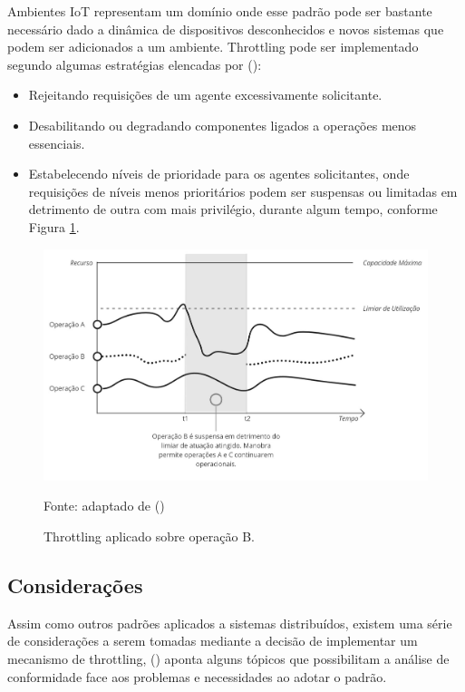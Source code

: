 Ambientes IoT representam um domínio onde esse padrão pode ser bastante necessário dado a dinâmica de dispositivos desconhecidos e novos sistemas que podem ser adicionados a um ambiente. Throttling pode ser implementado segundo algumas estratégias elencadas por \citeauthor{martinekuan_throttling_nodate} (\citeyear{martinekuan_throttling_nodate}):

\begin{itemize}
	\item Rejeitando requisições de um agente excessivamente solicitante.
	\item Desabilitando ou degradando componentes ligados a operações menos essenciais. 
	\item Estabelecendo níveis de prioridade para os agentes solicitantes, onde requisições de níveis menos prioritários podem ser suspensas ou limitadas em detrimento de outra com mais privilégio, durante algum tempo, conforme Figura \ref{fig:cap2throttlingexample}.
\end{itemize}

\begin{figure}[H]
	\centering
	\caption{Throttling aplicado sobre operação B.}
	\label{fig:cap2throttlingexample}
	\includegraphics[width=0.8\linewidth]{Imagens/cap2/cap2throttlingexample}	
	
	Fonte: adaptado de \citeauthor{martinekuan_throttling_nodate} (\citeyear{martinekuan_throttling_nodate})
\end{figure}

\subsection{Considerações}
Assim como outros padrões aplicados a sistemas distribuídos, existem uma série de considerações a serem tomadas mediante a decisão de implementar um mecanismo de throttling, \citeauthor{martinekuan_throttling_nodate} (\citeyear{martinekuan_throttling_nodate}) aponta alguns tópicos que possibilitam a análise de conformidade face aos problemas e necessidades ao adotar o padrão.  

